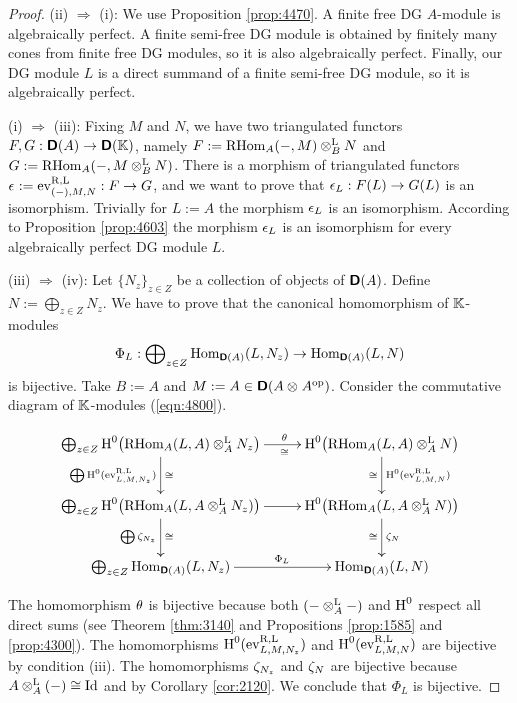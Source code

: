\begin{proof} \mbox{} 

\smallskip \noindent
(ii) $\Rightarrow$ (i): We use Proposition \ref{prop:4470}. A finite free DG 
$A$-module is algebraically perfect. A finite semi-free DG module is 
obtained by finitely many cones from finite free DG modules, so it is also 
algebraically perfect. Finally, our DG module $L$ is a direct summand of a 
finite semi-free DG module, so it is algebraically perfect.

\medskip \noindent 
(i) $\Rightarrow$ (iii): Fixing $M$ and $N$, we have two triangulated functors 
$F, G : \boldsymbol{\mathsf{D}}(A) \to \boldsymbol{\mathsf{D}}(\mathbb{K})$,
namely 
$F := \operatorname{RHom}_{A}(-, M) \otimes^{\mathrm{L}}_{B} N$
and
$G := \operatorname{RHom}_{A}(-, M \otimes^{\mathrm{L}}_{B} N)$.
There is a morphism of triangulated functors 
$\epsilon_{} := \operatorname{ev}^{\mathrm{R, L}}_{(-), M, N} : F \to  G$,
and we want to prove that $\epsilon_L : F(L) \to  G(L)$ is an isomorphism.
Trivially for $L := A$ the morphism $\epsilon_{L}$ is an isomorphism. 
According to Proposition \ref{prop:4603} the morphism $\epsilon_L$ is an isomorphism 
for every algebraically perfect DG module $L$. 

\medskip \noindent 
(iii) $\Rightarrow$ (iv): Let $\{ N_z \}_{z \in Z}$ be a collection of objects 
of $\boldsymbol{\mathsf{D}}(A)$. Define $N := \bigoplus_{z \in Z} N_z$.
We have to prove that the canonical homomorphism of $\mathbb{K}$-modules 
\[ \Phi_L : \bigoplus\nolimits_{z \in Z} \operatorname{Hom}_{\boldsymbol{\mathsf{D}}(A)}(L, N_z) \to 
\operatorname{Hom}_{\boldsymbol{\mathsf{D}}(A)} (L, N) \]
is bijective. Take $B := A$ and 
$M := A \in \boldsymbol{\mathsf{D}}(A \otimes_{} A^{\mathrm{op}})$. 
Consider the commutative diagram of $\mathbb{K}$-modules (\ref{eqn:4800}).
\begin{figure}
\begin{equation} \label{eqn:4800} 
\UseTips  \xymatrix @C=6ex @R=6ex {
\bigoplus_{z \in Z} \opn{H}^0 \bigl( \opn{RHom}_A(L, A) \ot^{\mrm{L}}_{A} N_z
\bigr) 
\ar[r]^(0.56){\th}_(0.56){\cong}
\ar[d]_{\bigoplus \opn{H}^0(\opn{ev}^{\mrm{R, L}}_{L, M, N_z})}^{\cong}
&
\opn{H}^0 \bigl( \opn{RHom}_A(L, A) \ot^{\mrm{L}}_{A} N \bigr) 
\ar[d]^{\opn{H}^0(\opn{ev}^{\mrm{R, L}}_{L, M, N})}_{\cong}
\\
\bigoplus_{z \in Z}  \opn{H}^0 \bigl( \opn{RHom}_A(L, A \ot^{\mrm{L}}_{A} N_z)
\bigr) 
\ar[r]
\ar[d]^{\cong}_{\bigoplus \ze_{N_z}}
&
\opn{H}^0 \bigl( \opn{RHom}_A(L, A \ot^{\mrm{L}}_{A} N) \bigr) 
\ar[d]_{\cong}^{\ze_{N}}
\\
\bigoplus_{z \in Z} \opn{Hom}_{\dcat{D}(A)}(L, N_z)
\ar[r]^(0.55){\Phi_L}
&
\opn{Hom}_{\dcat{D}(A)}(L, N)
}
\end{equation}
\end{figure}
The homomorphism $\theta$ is bijective because both $(- \otimes^{\mathrm{L}}_{A} -)$ 
and $\operatorname{H}^0$ respect all direct sums 
(see Theorem \ref{thm:3140} and Propositions \ref{prop:1585} and 
\ref{prop:4300}).
The homomorphisms $\operatorname{H}^0(\operatorname{ev}^{\mathrm{R, L}}_{L, M, N_z})$ and 
$\operatorname{H}^0(\operatorname{ev}^{\mathrm{R, L}}_{L, M, N})$ are bijective by condition (iii). 
The homomorphisms $\zeta_{N_z}$ and $\zeta_{N}$ are bijective because 
$A \otimes^{\mathrm{L}}_{A} (-) \cong \operatorname{Id}$ and by Corollary \ref{cor:2120}. 
We conclude that $\Phi_L$ is bijective. 


\end{proof}
